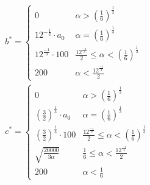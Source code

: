 \documentclass{article}
\begin{document}
\begin{description}
        \begin{align}
          b^*=\begin{cases}
             0 & \alpha >\left(\frac{1}{6}\right)^{\frac{1}{3}} \\
             12^{-\frac{1}{3}}\cdot a_0 & \alpha =\left(\frac{1}{6}\right)^{\frac{1}{3}} \\
             12^{\frac{-1}{3}}\cdot 100 & \frac{12^{\frac{-1}{3}}}{2}\leq \alpha <\left(\frac{1}{6}\right)^{\frac{1}{3}} \\
             200 & \alpha <\frac{12^{\frac{-1}{3}}}{2}
            \end{cases}\\
            c^*=\begin{cases}
             0 & \alpha >\left(\frac{1}{6}\right)^{\frac{1}{3}} \\
             \left(\frac{3}{2}\right)^{\frac{1}{3}}\cdot a_0 & \alpha =\left(\frac{1}{6}\right)^{\frac{1}{3}} \\
             \left(\frac{3}{2}\right)^{\frac{1}{3}}\cdot 100 & \frac{12^{\frac{-1}{3}}}{2}\leq \alpha <\left(\frac{1}{6}\right)^{\frac{1}{3}} \\
             \sqrt{\frac{20000}{3\alpha }} & \frac{1}{6}\leq \alpha <\frac{12^{\frac{-1}{3}}}{2} \\
             200 & \alpha <\frac{1}{6}
            \end{cases}
        \end{align}


\end{description}
\end{document}

